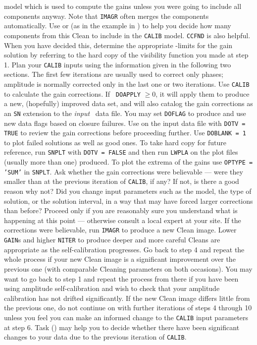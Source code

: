    model which is used to compute the gains unless you were going to
   include all components anyway.  Note that {\tt IMAGR} often merges
   the components automatically.
\Item Use {\tt {}} or {\tt {}} (as in the example
   in ) to help you decide how many components from this
   Clean to include in the {\tt CALIB} model.  {\tt CCFND} is also
   helpful.  When you have decided this, determine the appropriate
   \uv-limits for the gain solution by referring to the hard copy of
   the visibility function you made at step 1.
\Item Plan your {\tt CALIB} inputs using the information given in
   the following two sections.  The first few iterations are usually
   used to correct only phases; amplitude is normally corrected only
   in the last one or two iterations.
\Item Use {\tt CALIB} to calculate the gain corrections.  If {\tt
   DOAPPLY} $\ge 0$, it will apply them to produce a new, (hopefully)
   improved data set, and will also catalog the gain corrections as an
   {\tt SN} extension to the {\it input\/} \uv\ data file.  You may
   set {\tt DOFLAG} to produce and use new data flags based on closure
   failures.
\Item Use {\tt {}} on the input data file with {\tt DOTV =
   TRUE} to review the gain corrections before proceeding further.
   Use {\tt DOBLANK = 1} to plot failed solutions as well as good
   ones.  To take hard copy for future reference, run {\tt SNPLT} with
   {\tt DOTV = FALSE} and then run {\tt LWPLA} on the plot files
   (usually more than one) produced.  To plot the extrema of the gains
   use {\tt OPTYPE = 'SUM'} in {\tt SNPLT}\@.
\Item Ask whether the gain corrections were believable --- were they
   smaller than at the previous iteration of {\tt CALIB}, if any?  If
   not, is there a good reason why not?  Did you change input
   parameters such as the model, the type of solution, or the solution
   interval, in a way that may have forced larger corrections than
   before?  Proceed only if you are reasonably sure you understand
   what is happening at this point --- otherwise consult a local
   expert at your site.
\Item If the corrections were believable, run {\tt IMAGR} to produce
   a new Clean image.  Lower {\tt GAIN}s and higher {\tt NITER} to
   produce deeper and more careful Cleans are appropriate as the
   self-calibration progresses.
\Item Go back to step 4 and repeat the whole process if your new
   Clean image is a significant improvement over the previous one
   (with comparable Cleaning parameters on both occasions).  You may
   want to go back to step 1 and repeat the process from there if you
   have been using amplitude self-calibration and wish to check that
   your amplitude calibration has not drifted significantly.  If the
   new Clean image differs little from the previous one, do not
   continue on with further iterations of steps 4 through 10 unless
   you feel you can make an informed change to the {\tt CALIB} input
   parameters at step 6.  Task {\tt {}} () may
   help you to decide whether there have been significant changes to
   your data due to the previous iteration of {\tt CALIB}\@.
\xeen

